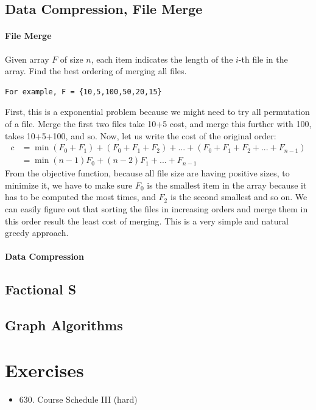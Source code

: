 \documentclass[../main.tex]{subfiles}
\begin{document}
\subsection{Data Compression, File Merge}
\paragraph{File Merge}
Given array $F$ of size $n$, each item indicates the length of the $i$-th file in the array. Find the best ordering of merging all files. 
\begin{lstlisting}[numbers=none]
For example, F = {10,5,100,50,20,15}
\end{lstlisting}
First, this is a exponential problem because we might need to try all permutation of a file. Merge the first two files take 10+5 cost, and merge this further with 100, takes 10+5+100, and so. Now, let us write the cost of the original order:
\begin{align}
    c &= \min (F_0+F_1) + (F_0+F_1+F_2) + ... + (F_0+F_1+F_2+...+F_{n-1}) \\
    &=\min(n-1) F_0 + (n-2) F_1+ ...+F_{n-1}
\end{align}
From the objective function, because all file size are having positive sizes, to minimize it, we have to make sure $F_0$ is the smallest item in the array because it has to be computed the most times, and $F_2$ is the second smallest and so on. We can easily figure out that sorting the files in increasing orders and merge them in this order result the least cost of merging. This is a very simple and natural greedy approach. 
\paragraph{Data Compression}
\subsection{Factional S}
\subsection{Graph Algorithms}
\section{Exercises}
\begin{itemize}
    \item 630. Course Schedule III (hard)
\end{itemize}


\end{document}
